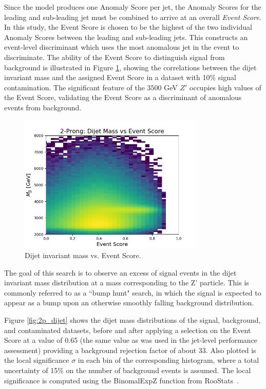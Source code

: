 \documentclass[11pt, a4paper]{article}
\begin{document}
Since the model produces one Anomaly Score per jet, the Anomaly Scores for the leading and sub-leading jet must be combined to arrive at an overall \textit{Event Score}. In this study, the Event Score is chosen to be the highest of the two individual Anomaly Scores between the leading and sub-leading jets. This constructs an event-level discriminant which uses the most anomalous jet in the event to discriminate. The ability of the Event Score to distinguish signal from background is illustrated in Figure \ref{fig:mjj_vs_evscore}, showing the correlations between the dijet invariant mass and the assigned Event Score in a dataset with 10\% signal contamination. The significant feature of the $3500$ GeV $Z'$ occupies high values of the Event Score, validating the Event Score as a discriminant of anomalous events from background.

\begin{figure}[H]
	\begin{center}
		\includegraphics[width=250pt]{imgs/bugfix/ProcR_2Prong_Contaminated_10p0_2Prong_Contaminated_10p0_Weights_Event_ConstOnly_Avg_JJ_M_vs_Event_Score_SaveForPaper_Lead.png}
	\end{center}
	\caption{Dijet invariant mass vs. Event Score.}
	\label{fig:mjj_vs_evscore}
\end{figure}

The goal of this search is to observe an excess of signal events in the dijet invariant mass distribution at a mass corresponding to the Z' particle. 
This is commonly referred to as a ``bump hunt" search, in which the signal is expected to appear as a bump upon an otherwise smoothly falling background distribution. 

Figure \ref{fig:2p_dijet} shows the dijet mass distributions of the signal, background, and contaminated datasets, before and after applying a selection on the Event Score at a value of 0.65 (the same value as was used in the jet-level performance assessment) providing a background rejection factor of about 33. Also plotted is the local significance $\sigma$ in each bin of the corresponding histogram, where a total uncertainty of 15\% on the number of background events is assumed. The local significance is computed using the {\sc BinomalExpZ} function from {\sc RooStats}~\cite{moneta2011roostats}. 
\end{document}

